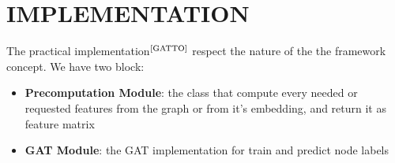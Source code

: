 \documentclass[12pt,conference]{ieeeconf} %
\begin{document}
\section{IMPLEMENTATION} 
The practical implementation$^{\text{\cite{GATTO}}}$ respect the nature of the the framework concept.
We have two block:
\begin{itemize}
    \item{\textbf{Precomputation Module}: the class that compute every needed or requested features from the graph or from it's embedding, and return it as feature matrix}
    \item{\textbf{GAT Module}: the GAT implementation for train and predict node labels}
\end{itemize}


\end{document}
